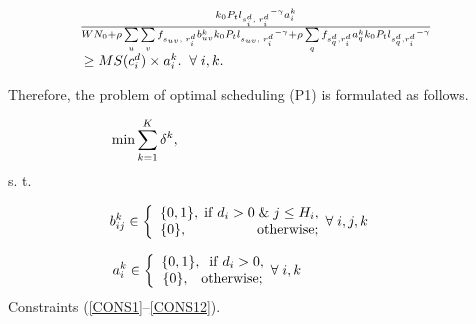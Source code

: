 \documentclass[journal]{IEEEtran}
\begin{document}
\begin{equation}
\begin{array}{l}\hspace{-0.2cm}
\frac{{{k_0}{P_t}{l_{s_i^d,\;r_i^d}}^{ - \gamma }a_i^k}}{{W{N_0} + \rho \sum\limits_u {\sum\limits_v {{f_{{s_{uv}},\;r_i^d}}b_{uv}^k{k_0}{P_t}{l_{{s_{uv}},\;r_i^d}}^{ - \gamma } + \rho \sum\limits_q {{f_{s_q^d,r_i^d}}a_q^k{k_0}{P_t}{l_{s_q^d,r_i^d}}^{ - \gamma }} } } }}\\
 \hspace{-0.1cm}\ge MS(c_i^d) \times a_i^k.\;\;\forall \;i,k.
\end{array}\label{CONS12}
\end{equation}














Therefore, the problem of optimal scheduling (P1) is formulated as follows.

\begin{equation}
 \min \sum\limits_{k = 1}^K
{{\delta ^k}} ,\label{OBJ} \hspace{5.8cm}
\end{equation}
\hspace{0.45cm}s. t.



\begin{equation}\hspace{-1cm}
b_{ij}^k \in \left\{ {\begin{array}{*{20}{c}}
{\{ 0,1\} ,\;{\rm{if}}\;{d_i} > 0\;\&\;j \le {H_i}},\\
{\{ 0\} ,\;\;\;\;\;\;\;\;\;\;\;\;\;\;\;\;\;\;{\rm{otherwise}};\hspace{0cm}}
\end{array}\forall \;i,j,k} \right.\hspace{0cm}\label{CONS2}
\end{equation}

\begin{equation}\hspace{-2.6cm}
a_i^k \in \left\{ {\begin{array}{*{20}{c}}
{\{ 0,1\} ,\;\;{\rm{if}}\;{d_i} > 0,}\\
{\{ 0\} ,\;\;\;{\rm{otherwise}};\hspace{0.0cm}}
\end{array}\forall\;i,k} \right.\hspace{0cm}\label{CONS3}
\end{equation}
\hspace{0.7cm}Constraints (\ref{CONS1}--\ref{CONS12}).
\end{document}
